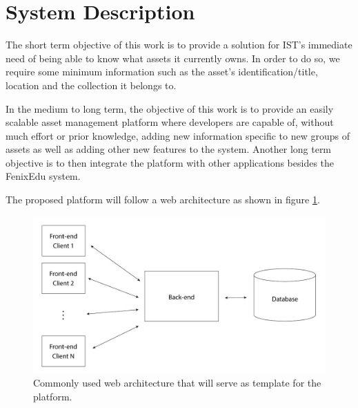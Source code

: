 
\section{System Description}

The short term objective of this work is to provide a solution for IST's immediate need of being able to know what assets it currently owns. In order to do so, we require some minimum information such as the asset's identification/title, location and the collection it belongs to.

In the medium to long term, the objective of this work is to provide an easily scalable asset management platform where developers are capable of, without much effort or prior knowledge, adding new information specific to new groups of assets as well as adding other new features to the system. Another long term objective is to then integrate the platform with other applications besides the FenixEdu system.

The proposed platform will follow a web architecture as shown in figure \ref{webArchitecture}.

\begin{figure}[h!]
    \centering
    \includegraphics[scale=0.19]{images/Architecture/thesisArquitecture.jpg}
    \caption[Web architecture]{Commonly used web architecture that will serve as template for the platform.}
    \label{webArchitecture}
\end{figure}

